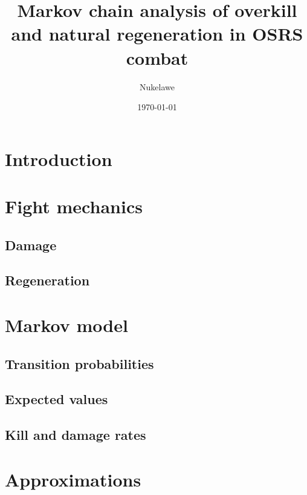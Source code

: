 

\title{Markov chain analysis of overkill and natural regeneration in OSRS combat}
\author{Nukelawe}
\date{\today}
\maketitle

\tableofcontents
\pagebreak

\section{Introduction}\label{chap:introduction}

\pagebreak

\section{Fight mechanics}\label{chap:mechanics}
	\subsection{Damage}\label{chap:fightMechanics}
	
	\subsection{Regeneration}\label{chap:regenMechanics}
	
\pagebreak

\section{Markov model}\label{chap:markovModel}
	
	\pagebreak
	\subsection{Transition probabilities}\label{chap:transitionProbabilities}
	
	\subsection{Expected values}\label{chap:expectations}
	
	\subsection{Kill and damage rates}\label{chap:rates}
	
\pagebreak

\section{Approximations}\label{chap:appr}
	
